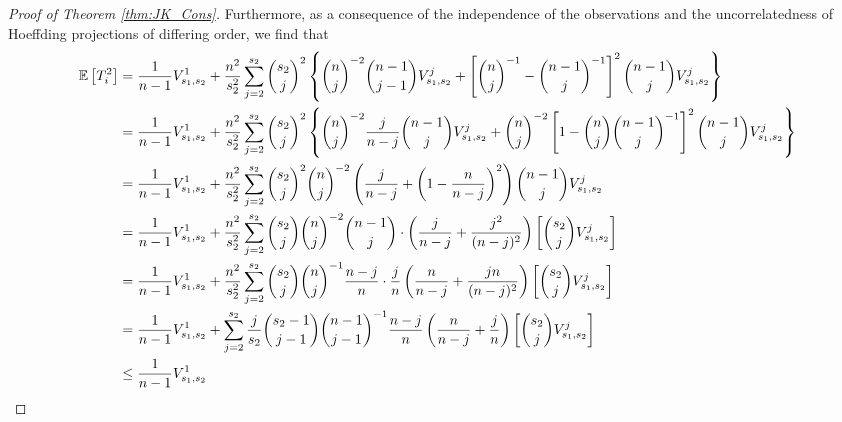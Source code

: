 \begin{proof}[Proof of Theorem \ref{thm:JK_Cons}]
	Furthermore, as a consequence of the independence of the observations and the
	uncorrelatedness of Hoeffding projections of differing order, we find that
	\begin{equation}
		\begin{aligned}
			\E\left[T_{i}^{2}\right]
			 & = \frac{1}{n-1} V_{s_1, s_2}^{1}
			+ \frac{n^2}{s_2^2}\sum_{j = 2}^{s_2}\binom{s_2}{j}^2\left\{
			\binom{n}{j}^{-2}\binom{n-1}{j-1}V_{s_1, s_2}^{j}
			+ \left[\binom{n}{j}^{-1} - \binom{n - 1}{j}^{-1}\right]^2 \binom{n-1}{j}V_{s_1, s_2}^{j}
			\right\}                                                                                                                         \\
			 & = \frac{1}{n-1} V_{s_1, s_2}^{1}
			+ \frac{n^2}{s_2^2}\sum_{j = 2}^{s_2}\binom{s_2}{j}^2\left\{
			\binom{n}{j}^{-2}\frac{j}{n - j}\binom{n-1}{j}V_{s_1, s_2}^{j}
			+ \binom{n}{j}^{-2}\left[1 - \binom{n}{j}\binom{n - 1}{j}^{-1}\right]^2 \binom{n-1}{j}V_{s_1, s_2}^{j}
			\right\}                                                                                                                         \\
			 & = \frac{1}{n-1} V_{s_1, s_2}^{1}
			+ \frac{n^2}{s_2^2}\sum_{j = 2}^{s_2}\binom{s_2}{j}^2\binom{n}{j}^{-2}
			\left(\frac{j}{n - j} + \left(1 - \frac{n}{n - j}\right)^2\right) \binom{n-1}{j}V_{s_1, s_2}^{j}                                 \\
			 & = \frac{1}{n-1} V_{s_1, s_2}^{1}
			+ \frac{n^2}{s_2^2}\sum_{j = 2}^{s_2}\binom{s_2}{j}
			\binom{n}{j}^{-2}\binom{n-1}{j} \cdot \left(\frac{j}{n - j} + \frac{j^2}{(n - j)^2}\right)
			\left[\binom{s_2}{j}V_{s_1, s_2}^{j}\right]                                                                                      \\
			 & = \frac{1}{n-1} V_{s_1, s_2}^{1}
			+ \frac{n^2}{s_2^2}\sum_{j = 2}^{s_2}\binom{s_2}{j}\binom{n}{j}^{-1}
			\frac{n - j}{n} \cdot \frac{j}{n}\left(\frac{n}{n - j} + \frac{j n}{(n - j)^2}\right)
			\left[\binom{s_2}{j}V_{s_1, s_2}^{j}\right]                                                                                      \\
			 & =  \frac{1}{n-1} V_{s_1, s_2}^{1}
			+ \sum_{j = 2}^{s_2}\frac{j}{s_2}
			\binom{s_2 - 1}{j - 1}\binom{n-1}{j-1}^{-1}
			\frac{n - j}{n} \left(\frac{n}{n - j} + \frac{j}{n}\right)
			\left[\binom{s_2}{j}V_{s_1, s_2}^{j}\right]                                                                                      \\
			 & \leq \frac{1}{n-1} V_{s_1, s_2}^{1}

\end{aligned}
\end{equation}
\end{proof}
